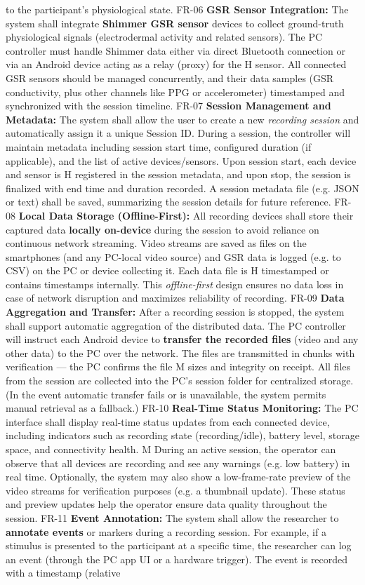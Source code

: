 to the participant's physiological state. FR-06 \textbf{GSR Sensor Integration:} The system shall integrate \textbf{Shimmer GSR sensor} devices to collect ground-truth physiological signals (electrodermal activity and related sensors). The PC controller must handle Shimmer data either via direct Bluetooth connection or via an Android device acting as a relay (proxy) for the H sensor. All connected GSR sensors should be managed concurrently, and their data samples (GSR conductivity, plus other channels like PPG or accelerometer) timestamped and synchronized with the session timeline. FR-07 \textbf{Session Management and Metadata:} The system shall allow the user to create a new \textit{recording session} and automatically assign it a unique Session ID. During a session, the controller will maintain metadata including session start time, configured duration (if applicable), and the list of active devices/sensors. Upon session start, each device and sensor is H registered in the session metadata, and upon stop, the session is finalized with end time and duration recorded. A session metadata file (e.g. JSON or text) shall be saved, summarizing the session details for future reference. FR-08 \textbf{Local Data Storage (Offline-First):} All recording devices shall store their captured data \textbf{locally on-device} during the session to avoid reliance on continuous network streaming. Video streams are saved as files on the smartphones (and any PC-local video source) and GSR data is logged (e.g. to CSV) on the PC or device collecting it. Each data file is H timestamped or contains timestamps internally. This \textit{offline-first} design ensures no data loss in case of network disruption and maximizes reliability of recording. FR-09 \textbf{Data Aggregation and Transfer:} After a recording session is stopped, the system shall support automatic aggregation of the distributed data. The PC controller will instruct each Android device to \textbf{transfer the recorded files} (video and any other data) to the PC over the network. The files are transmitted in chunks with verification --- the PC confirms the file M sizes and integrity on receipt. All files from the session are collected into the PC's session folder for centralized storage. (In the event automatic transfer fails or is unavailable, the system permits manual retrieval as a fallback.) FR-10 \textbf{Real-Time Status Monitoring:} The PC interface shall display real-time status updates from each connected device, including indicators such as recording state (recording/idle), battery level, storage space, and connectivity health. M During an active session, the operator can observe that all devices are recording and see any warnings (e.g. low battery) in real time. Optionally, the system may also show a low-frame-rate preview of the video streams for verification purposes (e.g. a thumbnail update). These status and preview updates help the operator ensure data quality throughout the session. FR-11 \textbf{Event Annotation:} The system shall allow the researcher to \textbf{annotate events} or markers during a recording session. For example, if a stimulus is presented to the participant at a specific time, the researcher can log an event (through the PC app UI or a hardware trigger). The event is recorded with a timestamp (relative 